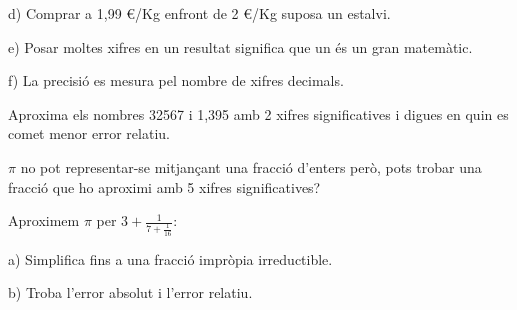 \begin{mylist}
d) Comprar a 1,99 €/Kg enfront de 2 €/Kg suposa un estalvi.

e) Posar moltes xifres en un resultat significa que un és un gran matemàtic.

f) La precisió es mesura pel nombre de xifres decimals.

\answers[cols=2]{[Depèn si $E_R$ o $E_A$, F, V, F, F, V]}


	\exer  Aproxima els nombres 32567 i 1,395 amb 2 xifres significatives i digues en quin es comet menor error relatiu.
	
	\exer  $\pi$ no pot representar-se mitjançant una fracció d'enters però, pots trobar una fracció que ho aproximi amb 5 xifres significatives? 
	
	\exer  Aproximem $\pi$ per $3+\frac{1}{7+\frac{1}{16} } $:
	

a) Simplifica fins a una fracció impròpia irreductible.

b) Troba l'error absolut i l'error relatiu.

\answers{[$\dfrac{355}{113}$, $E_A=2.67\cdot 10^{-7}$, $E_R=8.5\cdot 10^{-6}$]}

\end{mylist}


